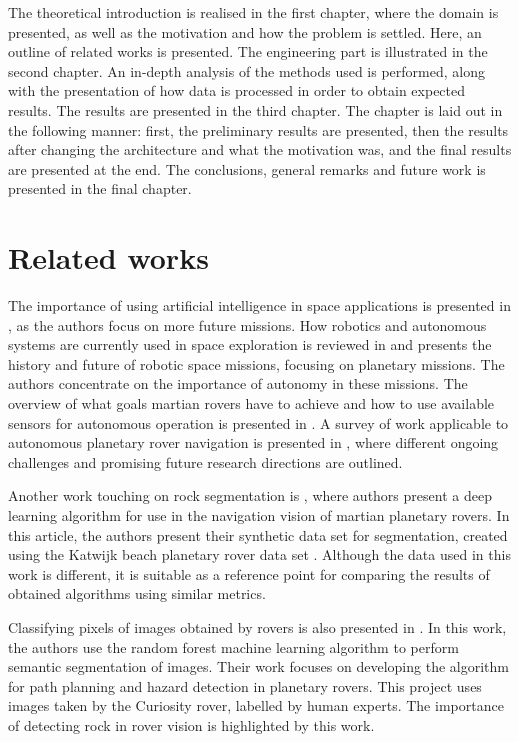 \documentclass[a4paper,twoside,12pt]{book}
\begin{document}
The theoretical introduction is realised in the first chapter, where the domain is presented, as well as the motivation and how the problem is settled. Here, an outline of related works is presented. The engineering part is illustrated in the second chapter. An in-depth analysis of the methods used is performed, along with the presentation of how data is processed in order to obtain expected results. The results are presented in the third chapter. The chapter is laid out in the following manner: first, the preliminary results are presented, then the results after changing the architecture and what the motivation was, and the final results are presented at the end. The conclusions, general remarks and future work is presented in the final chapter.

\section{Related works}
The importance of using artificial intelligence in space applications is presented in \cite{chien2006future}, as the authors focus on more future missions. How robotics and autonomous systems are currently used in space exploration is reviewed in \cite{gao2017review} and presents the history and future of robotic space missions, focusing on planetary missions. The authors concentrate on the importance of autonomy in these missions. The overview of what goals martian rovers have to achieve and how to use available sensors for autonomous operation is presented in \cite{bajracharya2008autonomy}. A survey of work applicable to autonomous planetary rover navigation is presented in \cite{wong2017adaptive}, where different ongoing challenges and promising future research directions are outlined.

Another work touching on rock segmentation is \cite{kuang2021rock}, where authors present a deep learning algorithm for use in the navigation vision of martian planetary rovers. In this article, the authors present their synthetic data set for segmentation, created using the Katwijk beach planetary rover data set \cite{hewitt2018katwijk}. Although the data used in this work is different, it is suitable as a reference point for comparing the results of obtained algorithms using similar metrics.

Classifying pixels of images obtained by rovers is also presented in \cite{ono2015risk}. In this work, the authors use the random forest machine learning algorithm to perform semantic segmentation of images. Their work focuses on developing the algorithm for path planning and hazard detection in planetary rovers. This project uses images taken by the Curiosity rover, labelled by human experts. The importance of detecting rock in rover vision is highlighted by this work.
\end{document}
